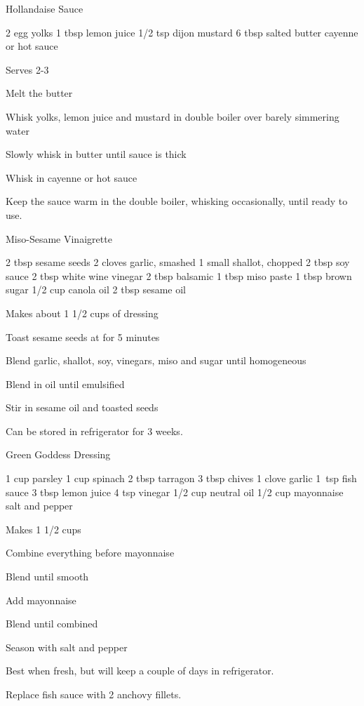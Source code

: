 \begin{recipe}{Hollandaise Sauce}{}
\begin{ingredients}
2 egg yolks
1 tbsp lemon juice
1/2 tsp dijon mustard
6 tbsp salted butter
cayenne or hot sauce
\end{ingredients}
\nextcolumn
Serves 2-3
\begin{steps}
    \item Melt the butter
    \item Whisk yolks, lemon juice and mustard in double boiler over barely simmering water
    \item Slowly whisk in butter until sauce is thick
    \item Whisk in cayenne or hot sauce
\end{steps}
Keep the sauce warm in the double boiler, whisking occasionally, until ready to use.
\end{recipe}

\begin{recipe}{Miso-Sesame Vinaigrette}{}
\begin{ingredients}
2 tbsp sesame seeds
2 cloves garlic, smashed
1 small shallot, chopped
2 tbsp soy sauce
2 tbsp white wine \ibreak vinegar
2 tbsp balsamic
1 tbsp miso paste
1 tbsp brown sugar
1/2 cup canola oil
2 tbsp sesame oil
\end{ingredients}
\nextcolumn
Makes about 1 1/2 cups of dressing
\begin{steps}
    \item Toast sesame seeds at  for 5 minutes
    \item Blend garlic, shallot, soy, vinegars, miso and sugar until homogeneous
    \item Blend in oil until emulsified
    \item Stir in sesame oil and toasted seeds
\end{steps}
Can be stored in refrigerator for 3 weeks.
\end{recipe}

\begin{recipe}{Green Goddess Dressing}{}
\begin{ingredients}
1 cup parsley
1 cup spinach
2 tbsp tarragon
3 tbsp chives
1 clove garlic
1~tsp fish sauce
3 tbsp lemon juice
4 tsp vinegar
1/2 cup neutral oil
1/2 cup mayonnaise
salt and pepper
\end{ingredients}
\nextcolumn
Makes 1 1/2 cups
\begin{steps}
    \item Combine everything before mayonnaise
    \item Blend until smooth
    \item Add mayonnaise
    \item Blend until combined
    \item Season with salt and pepper
\end{steps}
Best when fresh, but will keep a couple of days in refrigerator.

Replace fish sauce with 2 anchovy fillets.
\end{recipe}

